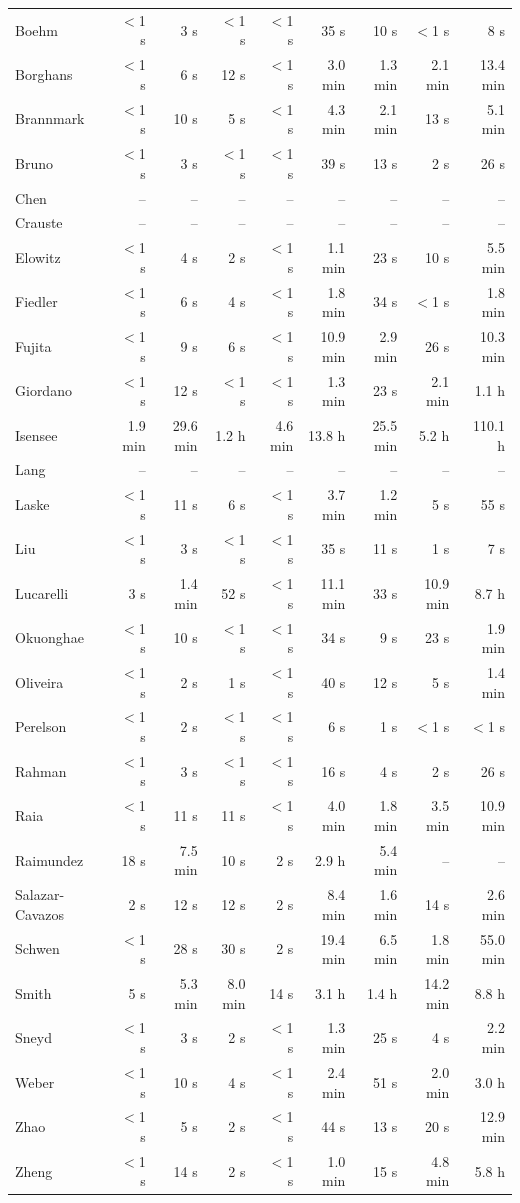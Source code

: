 \begin{longtable}{@{}lrrrrrrrr@{}}
Boehm & $<$1 s & 3 s & $<$1 s & $<$1 s & 35 s & 10 s & $<$1 s & 8 s \\
Borghans & $<$1 s & 6 s & 12 s & $<$1 s & 3.0 min & 1.3 min & 2.1 min & 13.4 min \\
Brannmark & $<$1 s & 10 s & 5 s & $<$1 s & 4.3 min & 2.1 min & 13 s & 5.1 min \\
Bruno & $<$1 s & 3 s & $<$1 s & $<$1 s & 39 s & 13 s & 2 s & 26 s \\
Chen & -- & -- & -- & -- & -- & -- & -- & -- \\
Crauste & -- & -- & -- & -- & -- & -- & -- & -- \\
Elowitz & $<$1 s & 4 s & 2 s & $<$1 s & 1.1 min & 23 s & 10 s & 5.5 min \\
Fiedler & $<$1 s & 6 s & 4 s & $<$1 s & 1.8 min & 34 s & $<$1 s & 1.8 min \\
Fujita & $<$1 s & 9 s & 6 s & $<$1 s & 10.9 min & 2.9 min & 26 s & 10.3 min \\
Giordano & $<$1 s & 12 s & $<$1 s & $<$1 s & 1.3 min & 23 s & 2.1 min & 1.1 h \\
Isensee & 1.9 min & 29.6 min & 1.2 h & 4.6 min & 13.8 h & 25.5 min & 5.2 h & 110.1 h \\
Lang & -- & -- & -- & -- & -- & -- & -- & -- \\
Laske & $<$1 s & 11 s & 6 s & $<$1 s & 3.7 min & 1.2 min & 5 s & 55 s \\
Liu & $<$1 s & 3 s & $<$1 s & $<$1 s & 35 s & 11 s & 1 s & 7 s \\
Lucarelli & 3 s & 1.4 min & 52 s & $<$1 s & 11.1 min & 33 s & 10.9 min & 8.7 h \\
Okuonghae & $<$1 s & 10 s & $<$1 s & $<$1 s & 34 s & 9 s & 23 s & 1.9 min \\
Oliveira & $<$1 s & 2 s & 1 s & $<$1 s & 40 s & 12 s & 5 s & 1.4 min \\
Perelson & $<$1 s & 2 s & $<$1 s & $<$1 s & 6 s & 1 s & $<$1 s & $<$1 s \\
Rahman & $<$1 s & 3 s & $<$1 s & $<$1 s & 16 s & 4 s & 2 s & 26 s \\
Raia & $<$1 s & 11 s & 11 s & $<$1 s & 4.0 min & 1.8 min & 3.5 min & 10.9 min \\
Raimundez & 18 s & 7.5 min & 10 s & 2 s & 2.9 h & 5.4 min & -- & -- \\
Salazar-Cavazos & 2 s & 12 s & 12 s & 2 s & 8.4 min & 1.6 min & 14 s & 2.6 min \\
Schwen & $<$1 s & 28 s & 30 s & 2 s & 19.4 min & 6.5 min & 1.8 min & 55.0 min \\
Smith & 5 s & 5.3 min & 8.0 min & 14 s & 3.1 h & 1.4 h & 14.2 min & 8.8 h \\
Sneyd & $<$1 s & 3 s & 2 s & $<$1 s & 1.3 min & 25 s & 4 s & 2.2 min \\
Weber & $<$1 s & 10 s & 4 s & $<$1 s & 2.4 min & 51 s & 2.0 min & 3.0 h \\
Zhao & $<$1 s & 5 s & 2 s & $<$1 s & 44 s & 13 s & 20 s & 12.9 min \\
Zheng & $<$1 s & 14 s & 2 s & $<$1 s & 1.0 min & 15 s & 4.8 min & 5.8 h \\
\bottomrule
\end{longtable}
